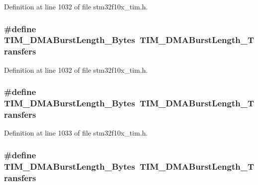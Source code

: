Definition at line 1032 of file stm32f10x\+\_\+tim.\+h.

\subsubsection[{\texorpdfstring{T\+I\+M\+\_\+\+D\+M\+A\+Burst\+Length\+\_\+13\+Bytes}{TIM_DMABurstLength_13Bytes}}]{\setlength{\rightskip}{0pt plus 5cm}\#define T\+I\+M\+\_\+\+D\+M\+A\+Burst\+Length\+\_\+Bytes~{\bf T\+I\+M\+\_\+\+D\+M\+A\+Burst\+Length\+\_\+Transfers}}\hypertarget{group___t_i_m___legacy_ga79a0397f1c33cc2d0a8b5bdd94eca845}{}\label{group___t_i_m___legacy_ga79a0397f1c33cc2d0a8b5bdd94eca845}


Definition at line 1032 of file stm32f10x\+\_\+tim.\+h.

\subsubsection[{\texorpdfstring{T\+I\+M\+\_\+\+D\+M\+A\+Burst\+Length\+\_\+14\+Bytes}{TIM_DMABurstLength_14Bytes}}]{\setlength{\rightskip}{0pt plus 5cm}\#define T\+I\+M\+\_\+\+D\+M\+A\+Burst\+Length\+\_\+Bytes~{\bf T\+I\+M\+\_\+\+D\+M\+A\+Burst\+Length\+\_\+Transfers}}\hypertarget{group___t_i_m___legacy_gae1e210b9c3609e854e05c3594aa01c01}{}\label{group___t_i_m___legacy_gae1e210b9c3609e854e05c3594aa01c01}


Definition at line 1033 of file stm32f10x\+\_\+tim.\+h.

\subsubsection[{\texorpdfstring{T\+I\+M\+\_\+\+D\+M\+A\+Burst\+Length\+\_\+14\+Bytes}{TIM_DMABurstLength_14Bytes}}]{\setlength{\rightskip}{0pt plus 5cm}\#define T\+I\+M\+\_\+\+D\+M\+A\+Burst\+Length\+\_\+Bytes~{\bf T\+I\+M\+\_\+\+D\+M\+A\+Burst\+Length\+\_\+Transfers}}\hypertarget{group___t_i_m___legacy_gae1e210b9c3609e854e05c3594aa01c01}{}\label{group___t_i_m___legacy_gae1e210b9c3609e854e05c3594aa01c01}


